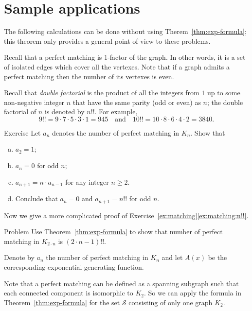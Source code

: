 \section*{Sample applications}

The following calculations can be done without using Therem~\ref{thm:exp-formula};
this theorem only provides a general point of view to these problems.

Recall that a perfect matching is 1-factor of the graph. 
In other words, it is a set of isolated edges which cover all the vertexes.
Note that if a graph admits a perfect matching then the number of its vertexes is even.

Recall that \emph{double factorial} is the product of all the integers from $1$ up to some non-negative integer $n$ that have the same parity (odd or even) as $n$;
the double factorial of $n$ is denoted by $n!!$.
For example, 
\[9!! = 9\cdot 7 \cdot 5 \cdot 3 \cdot  1 = 945
\quad\text{and}\quad
10!!=10\cdot8\cdot6\cdot4\cdot2=3840.
\]

\begin{thm}{Exercise}\label{ex:matching}
Let $a_n$ denotes the number of perfect matching in $K_n$.
Show that 
\begin{enumerate}[(a)]
 \item $a_2=1$;
 \item $a_n=0$ for odd $n$;
 \item\label{ex:matching:recursion} $a_{n+1}=n\cdot a_{n-1}$ for any integer $n\ge 2$.
 \item\label{ex:matching:n!!} 
 Conclude that $a_n=0$ and $a_{n+1}=n!!$ for odd $n$.
\end{enumerate}

\end{thm}

Now we give a more complicated proof of Exercise~\ref{ex:matching}\ref{ex:matching:n!!}.

\begin{thm}{Problem}
Use Theorem~\ref{thm:exp-formula} to show that number of perfect matching in $K_{2\cdot n}$ is $(2\cdot n-1)!!$.
\end{thm}

Denote by $a_n$ the number of perfect matching in $K_{n}$ and let $A(x)$ be the corresponding exponential generating function.

Note that a perfect matching can be defined as a spanning subgraph such that each connected component is isomorphic to $K_2$.
So we can apply the formula in Theorem~\ref{thm:exp-formula} for the set $\mathcal{S}$ consisting of only one graph $K_2$.

